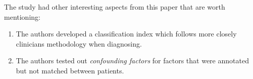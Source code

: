 \documentclass{Paper_Summary}
\begin{document}
    The study had other interesting aspects from this paper that are worth mentioning:
    \begin{enumerate}
        \item The authors developed a classification index which follows more closely clinicians methodology when diagnosing.
        \item The authors tested out \emph{confounding factors} for factors that were annotated but not matched between patients. 
    \end{enumerate}

\breakline
\end{document}
